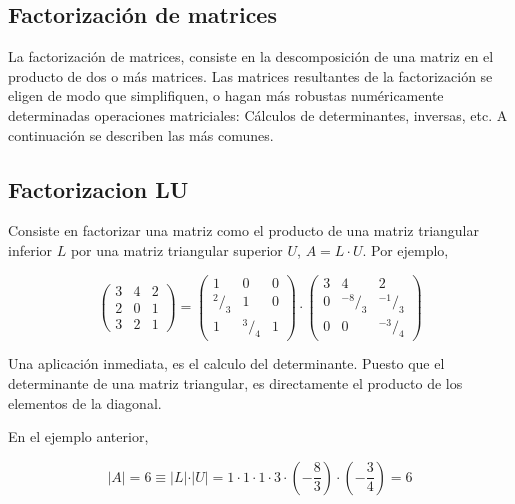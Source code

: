 \begin{paracol}{2}
\section{Factorización de matrices}\label{sec:fact}
La factorización de matrices, consiste en la descomposición de una matriz en el producto de dos o más matrices. Las matrices resultantes de la factorización se eligen de modo que simplifiquen, o hagan más robustas numéricamente determinadas operaciones matriciales: Cálculos de determinantes, inversas, etc. A continuación se describen las más comunes.

\subsection{Factorizacion LU}\label{sec:LU}
Consiste en factorizar una matriz como el producto de una matriz triangular inferior $L$ por una  matriz triangular superior $U$, $A=L\cdot U$. Por ejemplo,
\end{paracol}
\begin{equation*}
\begin{pmatrix}
3& 4& 2\\
2& 0& 1\\
3& 2& 1
\end{pmatrix} = \begin{pmatrix}
1& 0& 0\\
^2/_3 & 1& 0\\
1& ^3/_4& 1
\end{pmatrix}\cdot \begin{pmatrix}
3& 4& 2\\
0& ^{-8}/_3& ^{-1}/_3\\
0& 0& ^{-3}/_4
\end{pmatrix}
\end{equation*}
\begin{paracol}{2}
Una aplicación inmediata, es el calculo del determinante. Puesto que el determinante de una matriz triangular, es directamente el producto de los elementos de la diagonal.

En el ejemplo anterior,
\end{paracol}
\begin{equation*}
\vert A \vert = 6 \equiv \vert L \vert\cdot\vert U\vert =1 \cdot 1 \cdot 1 \cdot 3 \cdot (-\frac{8}{3})\cdot (-\frac{3}{4})=6    
\end{equation*}



